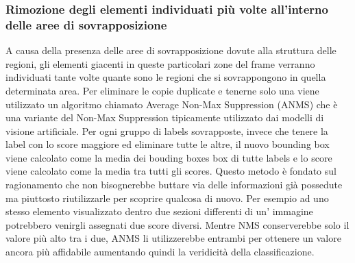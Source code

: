 \subsubsection{Rimozione degli elementi individuati più volte all'interno delle aree di sovrapposizione}
A causa della presenza delle aree di sovrapposizione dovute alla struttura delle regioni, gli elementi giacenti in queste particolari zone del frame verranno individuati tante volte quante sono le regioni che si sovrappongono in quella determinata area. Per eliminare le copie duplicate e tenerne solo una viene utilizzato un algoritmo chiamato Average Non-Max Suppression (ANMS) che è una variante del Non-Max Suppression tipicamente utilizzato dai modelli di visione artificiale. Per ogni gruppo di labels sovrapposte, invece che tenere la label con lo score maggiore ed eliminare tutte le altre, il nuovo bounding box viene calcolato come la media dei bouding boxes box di tutte labels e lo score viene calcolato come la media tra tutti gli scores.
Questo metodo è fondato sul ragionamento che non bisognerebbe buttare via delle informazioni già possedute ma piuttosto riutilizzarle per scoprire qualcosa di nuovo. Per esempio ad uno stesso elemento visualizzato dentro due sezioni differenti di un' immagine potrebbero venirgli assegnati due score diversi. Mentre NMS conserverebbe solo il valore più alto tra i due, ANMS li utilizzerebbe entrambi per ottenere un valore ancora più affidabile aumentando quindi la veridicità della classificazione.
